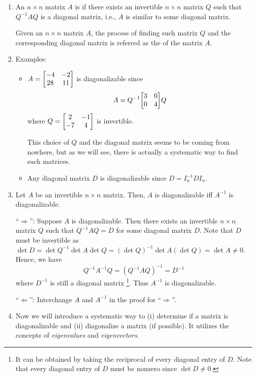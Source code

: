 \begin{enumerate}
\item An \(n\times n\) matrix \(A\) is  if there exists an
invertible \(n\times n\) matrix \(Q\) such that \(Q^{-1}AQ\) is a diagonal
matrix, i.e., \(A\) is similar to some diagonal matrix.

Given an \(n\times n\) matrix \(A\), the process of finding such matrix \(Q\)
and the corresponding diagonal matrix is referred as the 
of the matrix \(A\).

\item Examples:
\begin{itemize}
\item \(A=\mqty[-4&-2\\ 28&11]\) is diagonalizable since
\[
A=Q^{-1}\mqty[\dmat[0]{3,4}]Q
\]
where \(Q=\mqty[2&-1\\ -7&4]\) is invertible. \begin{note}
This choice of \(Q\) and the diagonal matrix seems to be coming
from nowhere, but as we will see, there is actually a
systematic way to find such matrices.
\end{note}
\item Any diagonal matrix \(D\) is diagonalizable since
\(D=I_n^{-1}DI_n\).
\end{itemize}

\item \label{it:inv-diag} Let \(A\) be an invertible \(n\times n\)
matrix. Then, \(A\) is diagonalizable iff \(A^{-1}\) is diagonalizable.

\begin{pf}
``\(\Rightarrow\)'': Suppose \(A\) is diagonalizable. Then
there exists an invertible \(n\times n\) matrix \(Q\) such
that \(Q^{-1}AQ=D\) for some diagonal matrix \(D\). Note that \(D\) must be invertible as \(\det D=\det Q^{-1}\det A\det Q=(\det Q)^{-1}\det A(\det Q)=\det A\ne 0\). Hence, we have
\[
Q^{-1}A^{-1}Q=(Q^{-1}AQ)^{-1}=D^{-1}
\]
where \(D^{-1}\) is still a diagonal matrix \footnote{It can be obtained
by taking the reciprocal of every diagonal entry of \(D\). Note that every
diagonal entry of \(D\) must be nonzero since \(\det D\ne 0\).}. Thus
\(A^{-1}\) is diagonalizable.

``\(\Leftarrow\)'': Interchange \(A\) and \(A^{-1}\) in the proof for ``\(\Rightarrow\)''.
\end{pf}

\item Now we will introduce a systematic way to (i) determine if a matrix is
diagonalizable and (ii) diagonalize a matrix (if possible). It utilizes the
concepts of \emph{eigenvalues} and \emph{eigenvectors}.


\end{enumerate}
